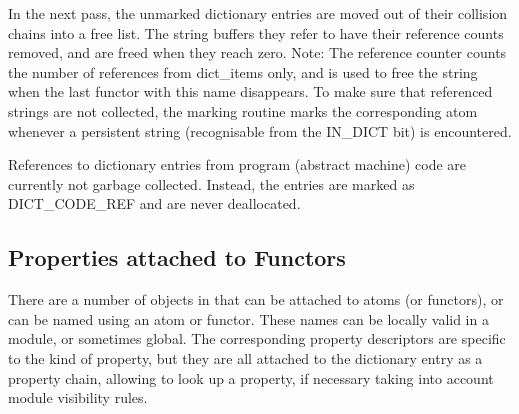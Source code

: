 In the next pass, the unmarked dictionary entries are moved out of their
collision chains into a free list.  The string buffers they refer to have
their reference counts removed, and are freed when they reach zero. 
Note:
The reference counter counts the number of references from dict_items only,
and is used to free the string when the last functor with this name disappears.
To make sure that referenced strings are not collected, the marking routine
marks the corresponding atom whenever a persistent string
(recognisable from the IN_DICT  bit) is encountered.

References to dictionary entries from program (abstract machine) code
are currently not garbage collected.  Instead, the entries are marked
as DICT_CODE_REF and are never deallocated.



\subsection{Properties attached to Functors}
\label{secproperty}
There are a number of objects in {\eclipse} that can be attached to atoms
(or functors), or can be named using an atom  or functor.
These names can be locally valid in a module, or sometimes global.
The corresponding property descriptors are specific to the kind of
property, but they are all attached to the dictionary entry as a property
chain, allowing to look up a property, if necessary taking into account module
visibility  rules.

